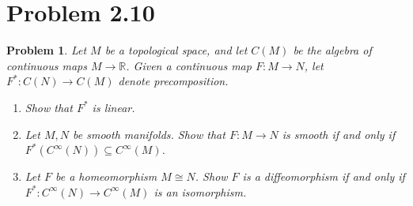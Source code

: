 \documentclass[11pt, letterpaper]{article}
\theoremstyle{theorem}
\newtheorem{problem}{Problem}
\begin{document}
\section{Problem 2.10}

\begin{problem}\label{8}
	Let $M$ be a topological space, and let $C(M)$ be the algebra of continuous maps $M\to \mathbb{R} $. Given a continuous map $F : M \to N$, let $F^* : C(N) \to C(M)$ denote precomposition.
	\begin{enumerate}
		\item Show that $F^*$ is linear.
		\item Let $M,N$ be smooth manifolds. Show that $F : M \to N$ is smooth if and only if $F^*(C^\infty (N))\subseteq C^\infty (M)$.
		\item Let $F$ be a homeomorphism $M\cong N$. Show $F$ is a diffeomorphism if and only if $F^*: C^\infty (N) \to C^\infty (M)$ is an isomorphism.
	\end{enumerate}
\end{problem}
\end{document}
